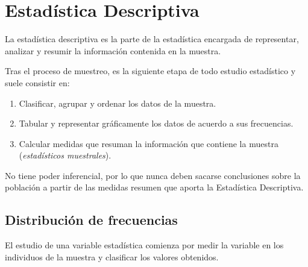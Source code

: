 \documentclass[
  a4paper,
]{scrreport}
\theoremstyle{definition}
\theoremstyle{definition}
\theoremstyle{plain}
\theoremstyle{remark}
\begin{document}

\hypertarget{estaduxedstica-descriptiva}{%
\chapter{Estadística Descriptiva}\label{estaduxedstica-descriptiva}}

La estadística descriptiva es la parte de la estadística encargada de
representar, analizar y resumir la información contenida en la muestra.

Tras el proceso de muestreo, es la siguiente etapa de todo estudio
estadístico y suele consistir en:

\begin{enumerate}
\def\labelenumi{\arabic{enumi}.}
\item
  Clasificar, agrupar y ordenar los datos de la muestra.
\item
  Tabular y representar gráficamente los datos de acuerdo a sus
  frecuencias.
\item
  Calcular medidas que resuman la información que contiene la muestra
  (\emph{estadísticos muestrales}).
\end{enumerate}

\begin{tcolorbox}[enhanced jigsaw, colbacktitle=quarto-callout-important-color!10!white, toptitle=1mm, colback=white, toprule=.15mm, bottomrule=.15mm, rightrule=.15mm, left=2mm, colframe=quarto-callout-important-color-frame, coltitle=black, bottomtitle=1mm, arc=.35mm, titlerule=0mm, title=\textcolor{quarto-callout-important-color}{\faExclamation}\hspace{0.5em}{Importante}, breakable, opacitybacktitle=0.6, leftrule=.75mm, opacityback=0]

No tiene poder inferencial, por lo que nunca deben sacarse conclusiones
sobre la población a partir de las medidas resumen que aporta la
Estadística Descriptiva.

\end{tcolorbox}

\hypertarget{distribuciuxf3n-de-frecuencias}{%
\section{Distribución de
frecuencias}\label{distribuciuxf3n-de-frecuencias}}

El estudio de una variable estadística comienza por medir la variable en
los individuos de la muestra y clasificar los valores obtenidos.
\end{document}
